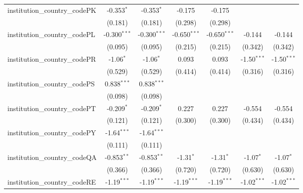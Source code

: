 \begin{tabular}{lcccccc}
   institution\_country\_codePK          & -0.353$^{*}$   & -0.353$^{*}$   & -0.175         & -0.175         &                &   \\   
                                         & (0.181)        & (0.181)        & (0.298)        & (0.298)        &                &   \\   
   institution\_country\_codePL          & -0.300$^{***}$ & -0.300$^{***}$ & -0.650$^{***}$ & -0.650$^{***}$ & -0.144         & -0.144\\   
                                         & (0.095)        & (0.095)        & (0.215)        & (0.215)        & (0.342)        & (0.342)\\   
   institution\_country\_codePR          & -1.06$^{*}$    & -1.06$^{*}$    & 0.093          & 0.093          & -1.50$^{***}$  & -1.50$^{***}$\\   
                                         & (0.529)        & (0.529)        & (0.414)        & (0.414)        & (0.316)        & (0.316)\\   
   institution\_country\_codePS          & 0.838$^{***}$  & 0.838$^{***}$  &                &                &                &   \\   
                                         & (0.098)        & (0.098)        &                &                &                &   \\   
   institution\_country\_codePT          & -0.209$^{*}$   & -0.209$^{*}$   & 0.227          & 0.227          & -0.554         & -0.554\\   
                                         & (0.121)        & (0.121)        & (0.300)        & (0.300)        & (0.434)        & (0.434)\\   
   institution\_country\_codePY          & -1.64$^{***}$  & -1.64$^{***}$  &                &                &                &   \\   
                                         & (0.111)        & (0.111)        &                &                &                &   \\   
   institution\_country\_codeQA          & -0.853$^{**}$  & -0.853$^{**}$  & -1.31$^{*}$    & -1.31$^{*}$    & -1.07$^{*}$    & -1.07$^{*}$\\   
                                         & (0.366)        & (0.366)        & (0.720)        & (0.720)        & (0.630)        & (0.630)\\   
   institution\_country\_codeRE          & -1.19$^{***}$  & -1.19$^{***}$  & -1.19$^{***}$  & -1.19$^{***}$  & -1.02$^{***}$  & -1.02$^{***}$\\   

\end{tabular}
